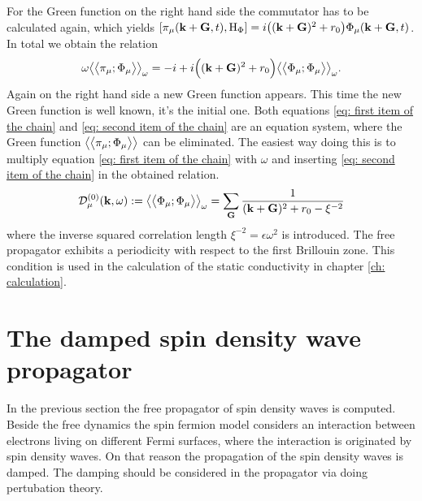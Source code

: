 For the Green function on the right hand side the commutator has to be calculated again, which yields $\comm{\pi_{\mu}(\vb{k}+\vb{G},t)}{\mt{H}_{\Phi}} = i \big((\vb{k}+\vb{G})^{2} + r_{0}\big) \Phi_{\mu}(\vb{k}+\vb{G},t)$.
In total we obtain the relation
%
\begin{align}
	\omega \green{\pi_{\mu}}{\Phi_{\mu}}_{\omega} = 
		-i + i\Big((\vb{k}+\vb{G})^{2} + r_{0} \Big) \green{\Phi_{\mu}}{\Phi_{\mu}}_{\omega}.
		\label{eq: second item of the chain}
\end{align}
%
Again on the right hand side a new Green function appears.
This time the new Green function is well known, it's the initial one.
Both equations \eqref{eq: first item of the chain} and \eqref{eq: second item of the chain} are an equation system, where the Green function $\big\langle\big\langle{\pi_{\mu}};{\Phi_{\mu}}\big\rangle\big\rangle$ can be eliminated.
The easiest way doing this is to multiply equation \eqref{eq: first item of the chain} with $\omega$ and inserting \eqref{eq: second item of the chain} in the obtained relation.
%
\begin{align}
	\mathcal{D}_{\mu}^{(0)}(\vb{k},\omega) := \green{\Phi_{\mu}}{\Phi_{\mu}}_{\omega} = \sum\limits_{\vb{G}} \frac{1}{(\vb{k}+\vb{G})^{2} + r_{0} - \xi^{-2}}
	\label{eq: free spin density wave propagator}
\end{align}
%
where the inverse squared correlation length $\xi^{-2} = \epsilon \omega^{2}$ is introduced.
The free propagator exhibits a periodicity with respect to the first Brillouin zone.
This condition is used in the calculation of the static conductivity in chapter \ref{ch: calculation}. 
%
%
\section{The damped spin density wave propagator}
\label{sec: damped propagator}
%
%
In the previous section the free propagator of spin density waves is computed.
Beside the free dynamics the spin fermion model considers an interaction between electrons living on different Fermi surfaces, where the interaction is originated by spin density waves.
On that reason the propagation of the spin density waves is damped.
The damping should be considered in the propagator via doing pertubation theory.

